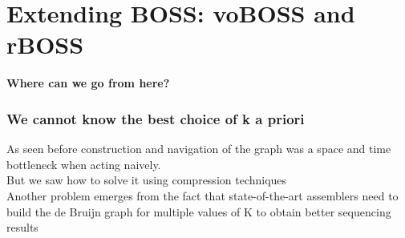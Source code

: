 \section{Extending BOSS: voBOSS and rBOSS}

\begin{frame}
\begin{center}
\textbf{Where can we go from here?}	
\end{center}

\end{frame}


\begin{frame}
\frametitle{We cannot know the best choice of k a priori}
As seen before construction and navigation of the graph was a space and time bottleneck when acting naively. \\
But we saw how to solve it using compression techniques
\\ \medskip 
Another problem emerges from the fact that state-of-the-art assemblers need to build the de Bruijn graph for multiple values
of K to obtain better sequencing results
\end{frame}


